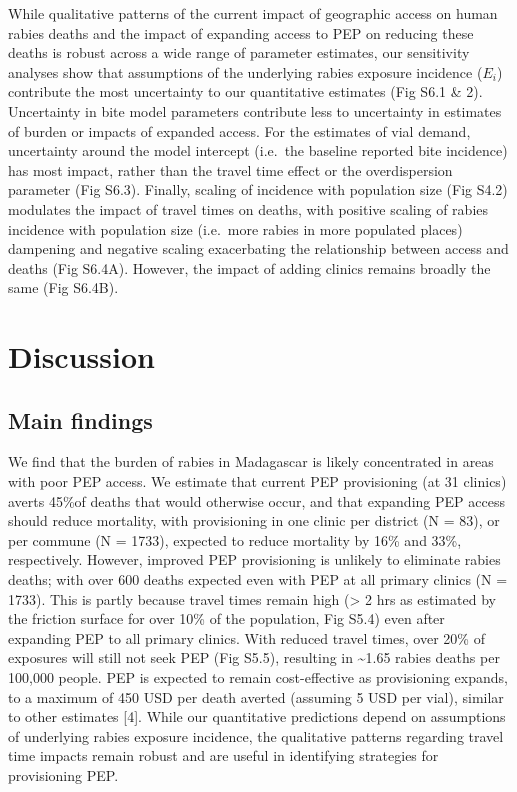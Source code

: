 \documentclass[
]{book}
\begin{document}
While qualitative patterns of the current impact of geographic access on
human rabies deaths and the impact of expanding access to PEP on
reducing these deaths is robust across a wide range of parameter
estimates, our sensitivity analyses show that assumptions of the
underlying rabies exposure incidence (\(E_{i}\)) contribute the most
uncertainty to our quantitative estimates (Fig S6.1 \& 2). Uncertainty in
bite model parameters contribute less to uncertainty in estimates of
burden or impacts of expanded access. For the estimates of vial demand,
uncertainty around the model intercept (i.e.~the baseline reported bite
incidence) has most impact, rather than the travel time effect or the
overdispersion parameter (Fig S6.3). Finally, scaling of incidence with
population size (Fig S4.2) modulates the impact of travel times on
deaths, with positive scaling of rabies incidence with population size
(i.e.~more rabies in more populated places) dampening and negative
scaling exacerbating the relationship between access and deaths (Fig
S6.4A). However, the impact of adding clinics remains broadly the same
(Fig S6.4B).

\hypertarget{discussion-1}{%
\section{Discussion}\label{discussion-1}}

\hypertarget{main-findings}{%
\subsection{Main findings}\label{main-findings}}

We find that the burden of rabies in Madagascar is likely concentrated
in areas with poor PEP access. We estimate that current PEP provisioning
(at 31 clinics) averts 45\%of deaths that would otherwise occur, and that
expanding PEP access should reduce mortality, with provisioning in one
clinic per district (N = 83), or per commune (N = 1733), expected to
reduce mortality by 16\% and 33\%, respectively. However, improved PEP
provisioning is unlikely to eliminate rabies deaths; with over 600
deaths expected even with PEP at all primary clinics (N = 1733). This is
partly because travel times remain high (\textgreater{} 2 hrs as estimated by the
friction surface for over 10\% of the population, Fig S5.4) even after
expanding PEP to all primary clinics. With reduced travel times, over
20\% of exposures will still not seek PEP (Fig S5.5), resulting in \textasciitilde1.65
rabies deaths per 100,000 people. PEP is expected to remain
cost-effective as provisioning expands, to a maximum of 450 USD per
death averted (assuming 5 USD per vial), similar to other estimates
{[}4{]}. While our quantitative predictions depend on assumptions of
underlying rabies exposure incidence, the qualitative patterns regarding
travel time impacts remain robust and are useful in identifying
strategies for provisioning PEP.
\end{document}
